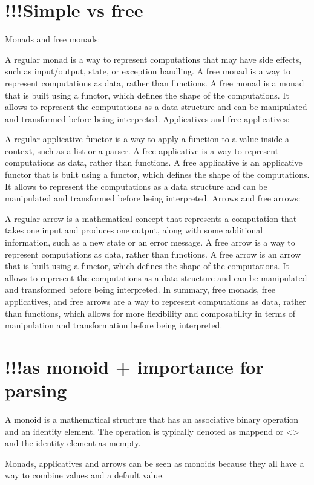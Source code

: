 \documentclass[12pt,twoside]{report}
\begin{document}
\section{!!!Simple vs free}
Monads and free monads:

A regular monad is a way to represent computations that may have side effects, such as input/output, state, or exception handling.
A free monad is a way to represent computations as data, rather than functions. A free monad is a monad that is built using a functor, which defines the shape of the computations. It allows to represent the computations as a data structure and can be manipulated and transformed before being interpreted.
Applicatives and free applicatives:

A regular applicative functor is a way to apply a function to a value inside a context, such as a list or a parser.
A free applicative is a way to represent computations as data, rather than functions. A free applicative is an applicative functor that is built using a functor, which defines the shape of the computations. It allows to represent the computations as a data structure and can be manipulated and transformed before being interpreted.
Arrows and free arrows:

A regular arrow is a mathematical concept that represents a computation that takes one input and produces one output, along with some additional information, such as a new state or an error message.
A free arrow is a way to represent computations as data, rather than functions. A free arrow is an arrow that is built using a functor, which defines the shape of the computations. It allows to represent the computations as a data structure and can be manipulated and transformed before being interpreted.
In summary, free monads, free applicatives, and free arrows are a way to represent computations as data, rather than functions, which allows for more flexibility and composability in terms of manipulation and transformation before being interpreted.

\section{!!!as monoid + importance for parsing}
A monoid is a mathematical structure that has an associative binary operation and an identity element. The operation is typically denoted as mappend or <> and the identity element as mempty.

Monads, applicatives and arrows can be seen as monoids because they all have a way to combine values and a default value.
\end{document}
